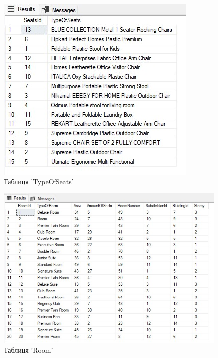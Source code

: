 \documentclass[a4paper,12pt]{article}
\begin{document}
	\begin{figure}[h!]
		\centering
		\begin{minipage}[h]{1\linewidth}
			\includegraphics[width=0.8\linewidth]{Prt sc/Figure_4.jpg}  
		\end{minipage}
		\caption{Таблиця 'TypeOfSeats'}
	\end{figure}
	
	\begin{figure}[h!]
		\centering
		\begin{minipage}[h]{1\linewidth}
			\includegraphics[width=0.8\linewidth]{Prt sc/Figure_5.jpg}  
		\end{minipage}
		\caption{Таблиця 'Room'}
	\end{figure}
	
\end{document}
